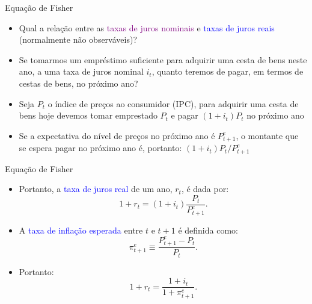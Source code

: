 \documentclass[10pt]{beamer}
\begin{document}
\begin{frame}{Equação de Fisher}
    \begin{itemize}
        \item Qual a relação entre as \textcolor{purple}{taxas de juros nominais} e \textcolor{blue}{taxas de juros reais} (normalmente não observáveis)?\bigskip

        \item Se tomarmos um empréstimo suficiente para adquirir uma cesta de bens neste ano, a uma taxa de juros nominal $i_t$, quanto teremos de pagar, em termos de cestas de bens, no próximo ano?\bigskip

        \item Seja $P_t$ o índice de preços ao consumidor (IPC), para adquirir uma cesta de bens hoje devemos tomar emprestado $P_t$ e pagar $(1 + i_t)P_t$ no próximo ano\bigskip

        \item Se a expectativa do nível de preços no próximo ano é $P_{t+1}^e$, o montante que se espera pagar no próximo ano é, portanto: $(1 + i_t)P_t/P_{t+1}^e$
    \end{itemize}
\end{frame}

\begin{frame}{Equação de Fisher}
    \begin{itemize}
        \item Portanto, a \textcolor{blue}{taxa de juros real} de um ano, $r_t$, é dada por:
        \begin{equation}
            1 + r_t = (1 + i_t)\frac{P_t}{P_{t+1}^e}.
            \label{aula6_ap_eq1}
        \end{equation}
        
        \item A \textcolor{blue}{taxa de inflação esperada} entre $t$ e $t+1$ é definida como:
        \begin{equation}
            \pi_{t+1}^e \equiv \frac{P_{t+1}^e - P_t}{P_t}.
            \label{aula6_ap_eq2}
        \end{equation}
        
        \item Portanto:
        \begin{equation}
            1 + r_t = \frac{1 + i_t}{1 + \pi_{t+1}^e}.
            \label{aula6_ap_eq3}
        \end{equation}
    \end{itemize}
\end{frame}
\end{document}
